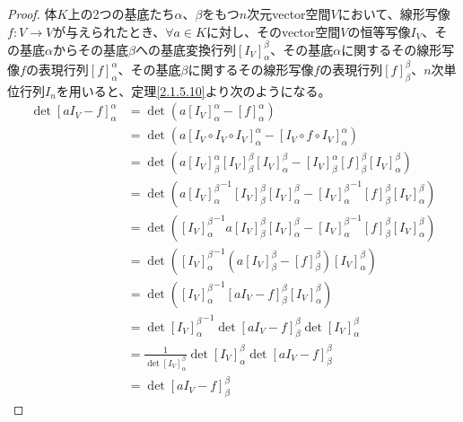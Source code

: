 \documentclass[dvipdfmx]{jsarticle}
\begin{document}
\begin{proof}
体$K$上の2つの基底たち$\alpha$、$\beta$をもつ$n$次元vector空間$V$において、線形写像$f:V \rightarrow V$が与えられたとき、$\forall a \in K$に対し、そのvector空間$V$の恒等写像$I_{V}$、その基底$\alpha$からその基底$\beta$への基底変換行列$\left[ I_{V} \right]^{\beta}_{\alpha}$、その基底$\alpha$に関するその線形写像$f$の表現行列$[ f]_{\alpha}^{\alpha}$、その基底$\beta$に関するその線形写像$f$の表現行列$[ f]_{\beta}^{\beta}$、$n$次単位行列$I_{n}$を用いると、定理\ref{2.1.5.10}より次のようになる。
\begin{align*}
\det\left[ aI_{V} - f \right]_{\alpha}^{\alpha} &= \det\left( a\left[ I_{V} \right]_{\alpha}^{\alpha} - [ f]_{\alpha}^{\alpha} \right)\\
&= \det\left( a\left[ I_{V} \circ I_{V} \circ I_{V} \right]_{\alpha}^{\alpha} - \left[ I_{V} \circ f \circ I_{V} \right]_{\alpha}^{\alpha} \right)\\
&= \det\left( a\left[ I_{V} \right]_{\beta}^{\alpha}\left[ I_{V} \right]_{\beta}^{\beta}\left[ I_{V} \right]_{\alpha}^{\beta} - \left[ I_{V} \right]_{\beta}^{\alpha}[ f]_{\beta}^{\beta}\left[ I_{V} \right]_{\alpha}^{\beta} \right)\\
&= \det\left( a{\left[ I_{V} \right]^{\beta}_{\alpha}}^{- 1}\left[ I_{V} \right]_{\beta}^{\beta}\left[ I_{V} \right]^{\beta}_{\alpha} - {\left[ I_{V} \right]_{\alpha}^{\beta}}^{- 1}[ f]_{\beta}^{\beta}\left[ I_{V} \right]_{\alpha}^{\beta} \right)\\
&= \det\left( {\left[ I_{V} \right]_{\alpha}^{\beta}}^{- 1}a\left[ I_{V} \right]_{\beta}^{\beta}\left[ I_{V} \right]_{\alpha}^{\beta} - {\left[ I_{V} \right]^{\beta}_{\alpha}}^{- 1}[ f]_{\beta}^{\beta}\left[ I_{V} \right]_{\alpha}^{\beta} \right)\\
&= \det\left( {\left[ I_{V} \right]_{\alpha}^{\beta}}^{- 1}\left( a\left[ I_{V} \right]_{\beta}^{\beta} - [ f]_{\beta}^{\beta} \right)\left[ I_{V} \right]_{\alpha}^{\beta} \right)\\
&= \det\left( {\left[ I_{V} \right]_{\alpha}^{\beta}}^{- 1}\left[ aI_{V} - f \right]_{\beta}^{\beta}\left[ I_{V} \right]_{\alpha}^{\beta} \right)\\
&= \det{\left[ I_{V} \right]_{\alpha}^{\beta}}^{- 1}\det\left[ aI_{V} - f \right]_{\beta}^{\beta}\det\left[ I_{V} \right]_{\alpha}^{\beta}\\
&= \frac{1}{\det\left[ I_{V} \right]_{\alpha}^{\beta}}\det\left[ I_{V} \right]_{\alpha}^{\beta}\det\left[ aI_{V} - f \right]_{\beta}^{\beta}\\
&= \det\left[ aI_{V} - f \right]_{\beta}^{\beta}
\end{align*}
\end{proof}
\end{document}
